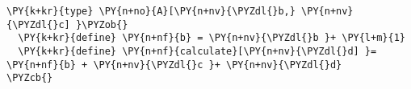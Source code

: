 \begin{Verbatim}[commandchars=\\\{\}]
\PY{k+kr}{type} \PY{n+no}{A}[\PY{n+nv}{\PYZdl{}b,} \PY{n+nv}{\PYZdl{}c] }\PYZob{}
  \PY{k+kr}{define} \PY{n+nf}{b} = \PY{n+nv}{\PYZdl{}b }+ \PY{l+m}{1}
  \PY{k+kr}{define} \PY{n+nf}{calculate}[\PY{n+nv}{\PYZdl{}d] }= \PY{n+nf}{b} + \PY{n+nv}{\PYZdl{}c }+ \PY{n+nv}{\PYZdl{}d}
\PYZcb{}
\end{Verbatim}
